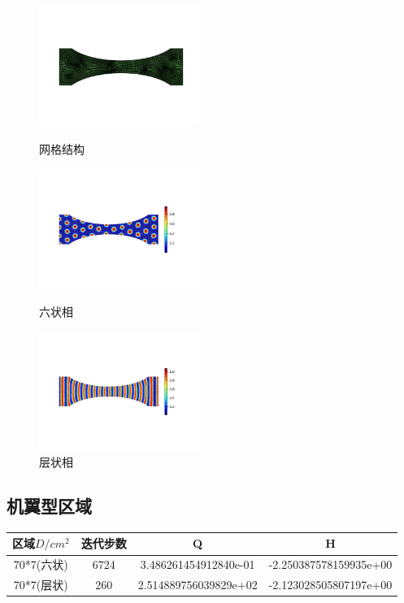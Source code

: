 \documentclass[12pt]{article}
\begin{document}
\begin{CJK}{UTF8}{gkai}
    \begin{figure}[H]
    	\setlength{\abovecaptionskip}{0.cm}
    	\setlength{\belowcaptionskip}{-0.cm}
    	\begin{minipage}[!htbp]{0.3\linewidth}
    		\includegraphics[width=5.2cm]{Figure_ac.png}
    		\caption*{网格结构}
    	\end{minipage}
    	\hspace{0.23in}
    	\begin{minipage}[!htbp]{0.3\linewidth}
    		\includegraphics[width=5.2cm]{scftfigure4000.png}
    		\caption*{六状相}
    	\end{minipage}
    	\hspace{0.23in}
    	\begin{minipage}[!htbp]{0.3\linewidth}
    		\includegraphics[width=5.2cm]{scftfigure80.png}
    		\caption*{层状相}
    	\end{minipage}
    \end{figure} 
    \subsection{机翼型区域}   
    \begin{table}[H]
    		\centering
    	\begin{tabular}{cccc}
    		\toprule
    		区域$D/cm^2$ &	迭代步数 & Q &  H \\
    		\midrule
    		70*7(六状)&6724 &3.486261454912840e-01 & -2.250387578159935e+00\\
    		70*7(层状)&260 &2.514889756039829e+02& -2.123028505807197e+00\\
    		\bottomrule
    	\end{tabular}
    \end{table}
    

\end{CJK}
\end{document}
